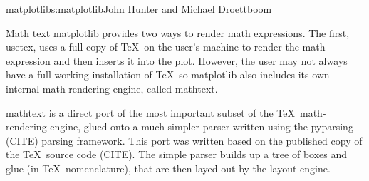 \begin{aosachapter}{matplotlib}{s:matplotlib}{John Hunter and Michael Droettboom}
\begin{aosasect1}{Math text}
matplotlib provides two ways to render math expressions.  The first,
usetex, uses a full copy of \TeX\ on the user's machine to render the
math expression and then inserts it into the plot.  However, the user
may not always have a full working installation of \TeX\, so
matplotlib also includes its own internal math rendering engine,
called mathtext.

mathtext is a direct port of the most important subset of the
\TeX\ math-rendering engine, glued onto a much simpler parser written
using the pyparsing (CITE) parsing framework.  This port was written
based on the published copy of the \TeX\ source code (CITE).  The
simple parser builds up a tree of boxes and glue (in
\TeX\ nomenclature), that are then layed out by the layout engine.

\end{aosasect1}

\end{aosachapter}
